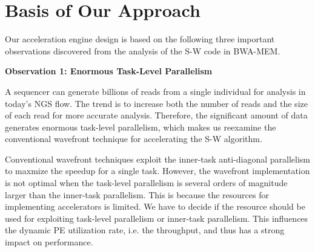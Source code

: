 \section{Basis of Our Approach}
\label{sec:approach}

Our acceleration engine design is based on the following three important observations 
discovered from the analysis of the S-W code in BWA-MEM.

\vspace{1pt}
\textbf{Observation 1: Enormous Task-Level Parallelism}
\vspace{1pt}

A sequencer can generate billions of reads from a single individual for analysis in today's NGS flow.
The trend is to increase both the number of reads and the size of each read for more accurate analysis.
Therefore, the significant amount of data generates enormous task-level parallelism, 
which makes us reexamine the conventional wavefront technique for accelerating the S-W algorithm.

Conventional wavefront techniques exploit the inner-task anti-diagonal parallelism to maxmize the speedup for a single task.
However, the wavefront implementation is not optimal when the task-level parallelism is several orders of magnitude larger than the inner-task parallelism.
This is because the resources for implementing accelerators is limited.
We have to decide if the resource should be used for exploiting task-level parallelism or inner-task parallelism.
This influences the dynamic PE utilization rate, i.e. the throughput, and thus has a strong impact on performance.

